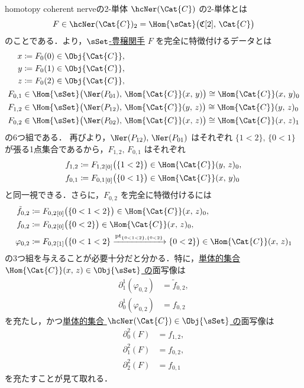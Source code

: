 \documentclass[TQFT_main]{subfiles}
\begin{document}
\begin{myexample}[label=ex:hcNer-2]{homotopy coherent nerveの2-単体}
    $\hcNer(\Cat{C})$ の2-単体とは
    \begin{align}
        F \in \hcNer(\Cat{C})_2 = \Hom{\sCat} \bigl( \mathfrak{C}[2],\, \Cat{C} \bigr) 
    \end{align}
    のことである．より，\hyperref[def:enriched-functor]{$\sSet$-豊穣関手} $F$ を完全に特徴付けるデータとは
    \begin{align}
        x &\coloneqq F_0(0) \in \Obj{\Cat{C}}, \\
        y &\coloneqq F_0(1) \in \Obj{\Cat{C}}, \\
        z &\coloneqq F_0(2) \in \Obj{\Cat{C}}, \\
        F_{0,1} &\in \Hom{\sSet} \bigl( \Ner(P_{01}),\, \Hom{\Cat{C}}(x,\, y) \bigr) \cong \Hom{\Cat{C}}(x,\, y)_0 \\
        F_{1,2} &\in \Hom{\sSet} \bigl( \Ner(P_{12}),\, \Hom{\Cat{C}}(y,\, z) \bigr) \cong \Hom{\Cat{C}}(y,\, z)_0 \\
        F_{0,2} &\in \Hom{\sSet} \bigl( \Ner(P_{02}),\, \Hom{\Cat{C}}(x,\, z) \bigr) \cong \Hom{\Cat{C}}(x,\, z)_1
    \end{align}
    の6つ組である．
    再びより，$\Ner(P_{12}),\, \Ner(P_{01})$ はそれぞれ $\{1<2\},\, \{0 < 1\}$ が張る1点集合であるから，$F_{1,2},\, F_{0,1}$ はそれぞれ
    \begin{align}
        f_{1,2} &\coloneqq F_{1,2}{}_{[0]} \bigl( \{1<2\} \bigr) \in \Hom{\Cat{C}} (y,\, z)_0,\\ 
        f_{0,1} &\coloneqq F_{0,1}{}_{[0]} \bigl( \{0<1\} \bigr) \in \Hom{\Cat{C}} (x,\, y)_0
    \end{align}
    と同一視できる．さらに，$F_{0,2}$ を完全に特徴付けるには
    \begin{align}
        \tilde{f}_{0,2} &\coloneqq F_{0,2}{}_{[0]} \bigl( \{0<1<2\} \bigr) \in \Hom{\Cat{C}} (x,\, z)_0, \\
        f_{0,2} &\coloneqq F_{0,2}{}_{[0]} \bigl( \{0<2\} \bigr) \in \Hom{\Cat{C}} (x,\, z)_0, \\
        \varphi_{0,2} &\coloneqq F_{0,2}{}_{[1]} \bigl( \{0<1<2\} \xrightarrow{\mathrm{pt}_{\{0<1<2\},\{0<2\}}} \{0<2\} \bigr) \in \Hom{\Cat{C}} (x,\, z)_1
    \end{align}
    の3つ組を与えることが必要十分だと分かる．特に，\underline{単体的集合 $\Hom{\Cat{C}}(x,\, z) \in \Obj{\sSet}$ の}面写像は
    \begin{align}
        \label{eq:homotopy-composer}
        \partial^1_1 (\varphi_{0,2}) &= \tilde{f}_{0,2}, \\
        \partial^1_0 (\varphi_{0,2}) &= f_{0,2}
    \end{align}
    を充たし，かつ\underline{単体的集合 $\hcNer (\Cat{C}) \in \Obj{\sSet}$ の}面写像は
    \begin{align}
        \partial^2_0 (F) &= f_{1,2}, \\
        \partial^2_1 (F) &= f_{0,2}, \\
        \partial^2_2 (F) &= f_{0,1}
    \end{align}
    を充たすことが見て取れる．
    

\end{myexample}
\end{document}
